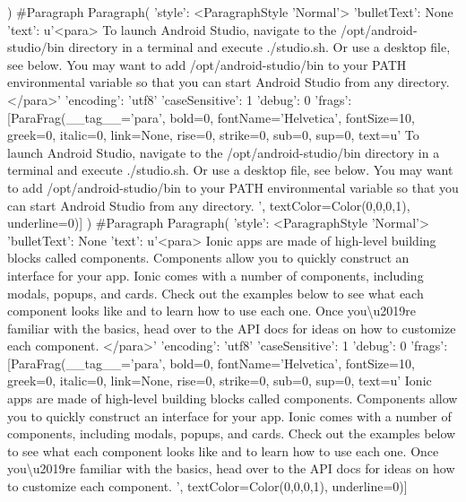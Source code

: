 \documentclass{article}%
\begin{document}
) \#Paragraph%
Paragraph(\newline%
'style': <ParagraphStyle 'Normal'>\newline%
'bulletText': None\newline%
'text': u'<para> To launch Android Studio, navigate to the /opt/android{-}studio/bin directory in a terminal and execute ./studio.sh. Or use a desktop file, see below. You may want to add /opt/android{-}studio/bin to your PATH environmental variable so that you can start Android Studio from any directory. </para>'\newline%
'encoding': 'utf8'\newline%
'caseSensitive': 1\newline%
'debug': 0\newline%
'frags': {[}ParaFrag(\_\_tag\_\_='para', bold=0, fontName='Helvetica', fontSize=10, greek=0, italic=0, link=None, rise=0, strike=0, sub=0, sup=0, text=u' To launch Android Studio, navigate to the /opt/android{-}studio/bin directory in a terminal and execute ./studio.sh. Or use a desktop file, see below. You may want to add /opt/android{-}studio/bin to your PATH environmental variable so that you can start Android Studio from any directory. ', textColor=Color(0,0,0,1), underline=0){]}\newline%
) \#Paragraph%
Paragraph(\newline%
'style': <ParagraphStyle 'Normal'>\newline%
'bulletText': None\newline%
'text': u'<para> Ionic apps are made of high{-}level building blocks called components. Components allow you to quickly construct an interface for your app. Ionic comes with a number of components, including modals, popups, and cards. Check out the examples below to see what each component looks like and to learn how to use each one. Once you\textbackslash{}u2019re familiar with the basics, head over to the API docs for ideas on how to customize each component. </para>'\newline%
'encoding': 'utf8'\newline%
'caseSensitive': 1\newline%
'debug': 0\newline%
'frags': {[}ParaFrag(\_\_tag\_\_='para', bold=0, fontName='Helvetica', fontSize=10, greek=0, italic=0, link=None, rise=0, strike=0, sub=0, sup=0, text=u' Ionic apps are made of high{-}level building blocks called components. Components allow you to quickly construct an interface for your app. Ionic comes with a number of components, including modals, popups, and cards. Check out the examples below to see what each component looks like and to learn how to use each one. Once you\textbackslash{}u2019re familiar with the basics, head over to the API docs for ideas on how to customize each component. ', textColor=Color(0,0,0,1), underline=0){]}\newline%
\end{document}
